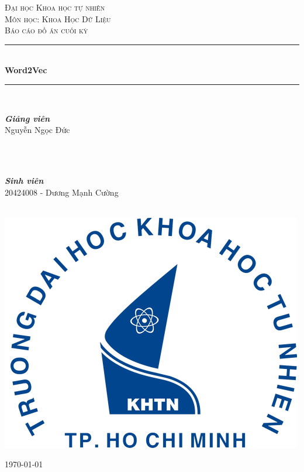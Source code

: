 \documentclass[12pt]{article}
\begin{document}
\begin{titlepage}

  \newcommand{\HRule}{\rule{\linewidth}{0.5mm}} 
  
  \center
  
  \textsc{\LARGE Đại học Khoa học tự nhiên}\\[1.5cm] 
  \textsc{\Large Môn học: Khoa Học Dữ Liệu}\\[0.5cm] 
  \textsc{\large Báo cáo đồ án cuối kỳ}\\[0.5cm] 
  
  \HRule \\[0.4cm]
  { \huge \bfseries Word2Vec}\\[0.4cm]
  \HRule \\[1.5cm]

  \begin{minipage}{0.4\textwidth}
  \begin{flushleft} \large
  \emph{\textbf{Giảng viên}}\\
  Nguyễn Ngọc Đức 
  \end{flushleft}
  \end{minipage}
  ~
  \begin{minipage}{0.4\textwidth}
  \begin{flushright}
    \large \emph{\\[3cm]\textbf{Sinh viên}} \\
    20424008 - Dương Mạnh Cường
  \end{flushright}
  \end{minipage}\\[2cm]

  \includegraphics{./images/logo_hcmus.png}\\[1cm]
  \vfill

  \today
  
  \end{titlepage}
\end{document}
